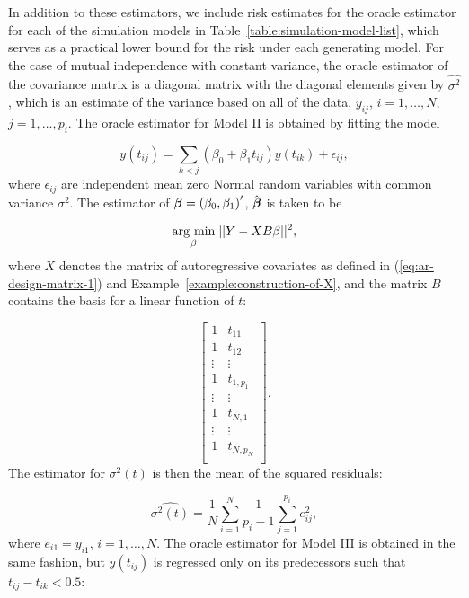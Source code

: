 \bigskip

In addition to these estimators, we include risk estimates for the oracle estimator for each of the simulation models in Table~\ref{table:simulation-model-list}, which serves as a practical lower bound for the risk under each generating model. For the case of mutual independence with constant variance, the oracle estimator of the covariance matrix is a diagonal matrix with the diagonal elements given by $\hat{\sigma^2}$, which is an estimate of the variance based on all of the data, $y_{ij}$, $i = 1,\dots, N$, $j = 1,\dots, p_i$. The oracle estimator for Model II is obtained by fitting the model

\begin{equation} \label{eq:model-2-oracle-model}
y\left(t_{ij}\right) = \sum_{k < j} \left(\beta_0 + \beta_1 t_{ij}\right) y\left( t_{ik} \right) + \epsilon_{ij},
\end{equation}
\noindent 
where $\epsilon_{ij}$ are independent mean zero Normal random variables with common variance $\sigma^2$. The estimator of $\mbox{\boldmath $\beta$} = \left(\beta_0, \beta_1\right)'$, $\hat{\mbox{\boldmath $\beta$}}$ is taken to be 

\begin{equation}\label{eq:model-2-oracle-estimator}
\underset{\beta}{\operatorname{arg}\,\operatorname{min}}\; \vert \vert Y - X B \beta \vert \vert^2, 
\end{equation}
\noindent
where $X$ denotes the matrix of autoregressive covariates as defined in (\ref{eq:ar-design-matrix-1}) and Example~\ref{example:construction-of-X}, and the matrix $B$ contains the basis for a linear function of $t$:

\[
\begin{bmatrix}
1 & t_{11} \\
1 & t_{12} \\
\vdots & \vdots \\
1 & t_{1,p_1} \\
\vdots & \vdots \\
1 & t_{N,1} \\
\vdots & \vdots \\
1 & t_{N,p_N} \\
\end{bmatrix}.
\]
\noindent
The estimator for $\sigma^2\left(t\right)$ is then the mean of the squared residuals:

\[
\hat{\sigma^2\left( t \right)} = \frac{1}{N}\sum_{i = 1}^N\frac{1}{p_i - 1} \sum_{j = 1}^{p_i} e_{ij}^2,
\]
\noindent
where $e_{i1} = y_{i1}$, $i = 1,\dots, N$. The oracle estimator for Model III is obtained in the same fashion, but $y\left(t_{ij}\right)$ is regressed only on its predecessors such that $t_{ij} - t_{ik} < 0.5$:

